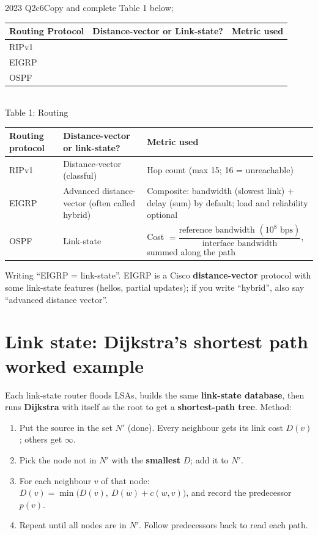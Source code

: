 \documentclass[10pt]{article}
\begin{document}
\begin{pastq}{2023 Q2c}{6}Copy and complete Table 1 below;\\[2pt]
\begin{tabular}{|l|l|l|}\hline
\textbf{Routing Protocol} & \textbf{Distance-vector or Link-state?} & \textbf{Metric used}\\\hline
RIPv1 & & \\\hline
EIGRP & & \\\hline
OSPF & & \\\hline
\end{tabular}\\[2pt]
{\small Table 1: Routing}\end{pastq}
\begin{ans}
\small
\begin{tabularx}{\linewidth}{@{}lXX@{}}
\toprule
\textbf{Routing protocol} & \textbf{Distance-vector or link-state?} & \textbf{Metric used}\\\midrule
RIPv1 & Distance-vector (classful) & Hop count (max 15; 16 = unreachable)\\
EIGRP & Advanced distance-vector (often called hybrid) & Composite: bandwidth (slowest link) + delay (sum) by default; load and reliability optional\\
OSPF & Link-state & Cost $= \dfrac{\text{reference bandwidth } (10^8 \text{ bps})}{\text{interface bandwidth}}$, summed along the path\\
\bottomrule
\end{tabularx}
\end{ans}
\begin{trap}
Writing ``EIGRP = link-state''. EIGRP is a Cisco \textbf{distance-vector} protocol with some link-state features (hellos, partial updates); if you write ``hybrid'', also say ``advanced distance vector''.
\end{trap}

\section{Link state: Dijkstra's shortest path worked example}\label{sec:dijkstra}

Each link-state router floods LSAs, builds the same \textbf{link-state database}, then runs \textbf{Dijkstra} with itself as the root to get a \textbf{shortest-path tree}. Method:
\begin{enumerate}
\item Put the source in the set $N'$ (done). Every neighbour gets its link cost $D(v)$; others get $\infty$.
\item Pick the node not in $N'$ with the \textbf{smallest} $D$; add it to $N'$.
\item For each neighbour $v$ of that node: $D(v) = \min\big(D(v),\ D(w) + c(w,v)\big)$, and record the predecessor $p(v)$.
\item Repeat until all nodes are in $N'$. Follow predecessors back to read each path.
\end{enumerate}
\end{document}
